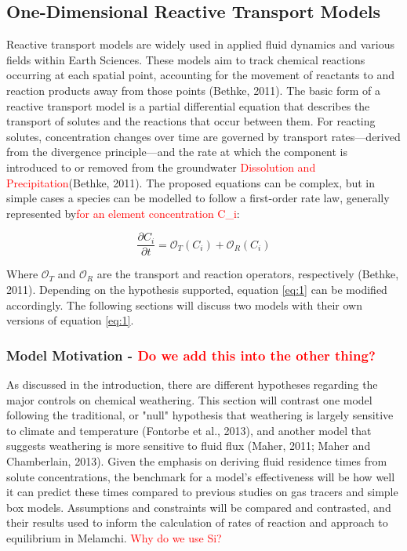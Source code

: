 \newpage


\subsection{One-Dimensional Reactive Transport Models}

Reactive transport models are widely used in applied fluid dynamics and various fields within Earth Sciences. These models aim to track chemical reactions occurring at each spatial point, accounting for the movement of reactants to and reaction products away from those points (Bethke, 2011). The basic form of a reactive transport model is a partial differential equation that describes the transport of solutes and the reactions that occur between them. For reacting solutes, concentration changes over time are governed by transport rates—derived from the divergence principle—and the rate at which the component is introduced to or removed from the groundwater \textcolor{red}{Dissolution and Precipitation}(Bethke, 2011). The proposed equations can be complex, but in simple cases a species can be modelled to follow a first-order rate law, generally represented by\textcolor{red}{for an element concentration C\_i}:

\begin{equation}
    \frac{\partial C_i}{\partial t} = \mathcal{O}_{T}(C_i) + \mathcal{O}_{R}(C_i)
    \label{eq:1}
\end{equation}


Where \(\mathcal{O}_{T}\) and \(\mathcal{O}_{R}\) are the transport and reaction operators, respectively (Bethke, 2011). Depending on the hypothesis supported, equation \ref{eq:1} can be modified accordingly. The following sections will discuss two models with their own versions of equation \ref{eq:1}.





\subsubsection{Model Motivation - \textcolor{red}{Do we add this into the other thing?}}

As discussed in the introduction, there are different hypotheses regarding the major controls on chemical weathering. This section will contrast one model following the traditional, or "null" hypothesis that weathering is largely sensitive to climate and temperature (Fontorbe et al., 2013), and another model that suggests weathering is more sensitive to fluid flux (Maher, 2011; Maher and Chamberlain, 2013). Given the emphasis on deriving fluid residence times from solute concentrations, the benchmark for a model's effectiveness will be how well it can predict these times compared to previous studies on gas tracers and simple box models. Assumptions and constraints will be compared and contrasted, and their results used to inform the calculation of rates of reaction and approach to equilibrium in Melamchi. \textcolor{red}{Why do we use Si?}



